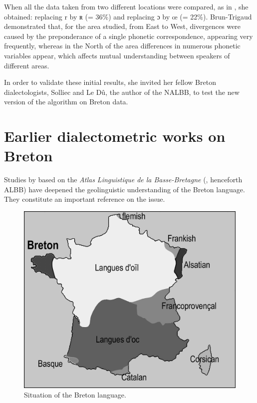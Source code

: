 \documentclass[output=paper]{LSP/langsci}
\begin{document}
When all the data taken from two different locations were compared, as in , she obtained: replacing {r} by {ʀ} (= 36\%) and replacing {ɔ} by {œ} (= 22\%). 
Brun-Trigaud demonstrated that, for the area studied, from East to West, divergences were caused by the preponderance of a single phonetic correspondence, appearing very frequently, whereas in the North of the area differences in numerous phonetic variables appear, which affects mutual understanding between speakers of different areas.

In order to validate these initial results, she invited her fellow Breton dialectologists, Solliec and Le Dû, the author of the NALBB, to test the new version of the algorithm on Breton data.

\section[Earlier dialectometric works on Breton ]{Earlier dialectometric works on Breton }
  
Studies by \citet{falchun_perspectives_1981} based on the \textit{Atlas Linguistique de la Basse-Bretagne} (\citealt{le_roux_atlas_1924}, henceforth ALBB) have deepened the geolinguistic understanding of the Breton language. They constitute an important reference on the issue. 

\begin{figure}
\includegraphics[width=.8\textwidth]{illustrations/brun_etal_fig1_v2}
\caption{Situation of the Breton language.}
\label{fig:1}
\end{figure}
\end{document}

